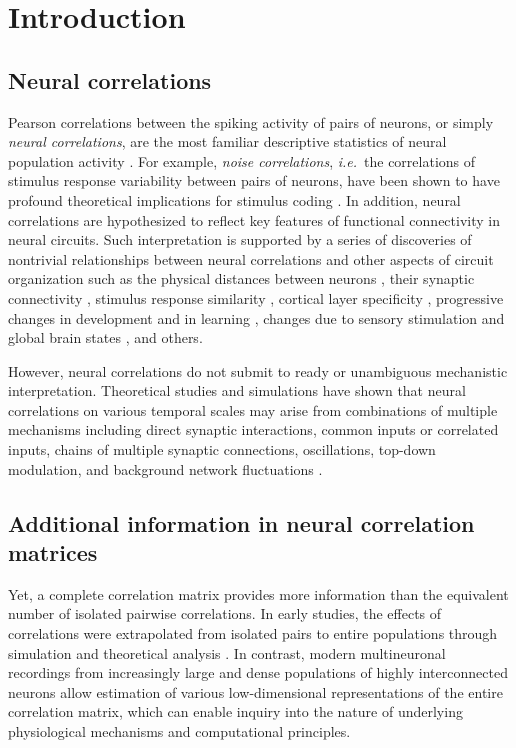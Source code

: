 \documentclass[10pt]{article}
\begin{document}
\section*{Introduction}
\subsection*{Neural correlations}
Pearson correlations between the spiking activity of pairs of neurons, or simply \emph{neural correlations}, are the most familiar descriptive statistics of neural population activity \cite{Averbeck:2006,Zohary:1994,Kohn:2005,Bair:2001,Ecker:2010}.  For example, \emph{noise correlations}, \emph{i.e.}~the correlations of stimulus response variability between pairs of neurons, have been shown to have profound theoretical implications for stimulus coding \cite{Zohary:1994,Abbott:1999,Sompolinsky:2001,Wilke:2002,Averbeck:2006,Josic:2009,Berens:2011,Ecker:2011}. In addition, neural correlations are hypothesized to reflect key features of functional connectivity in neural circuits.  Such interpretation is supported by a series of discoveries of nontrivial relationships between neural correlations and other aspects of circuit organization such as the physical distances between neurons \cite{Smith:2008,Denman:2013}, their synaptic connectivity \cite{Ko:2011},  stimulus response similarity \cite{Bair:2001,Kohn:2005,Cohen:2008,Cohen:2009,Ko:2011,Smith:2013b}, cortical layer specificity \cite{Hansen:2012,Smith:2013}, progressive changes in development and in learning \cite{Golshani:2009,Gu:2011}, changes due to sensory stimulation and global brain states \cite{Goard:2009,Kohn:2009,Ecker:2010,Renart:2010}, and others.

However, neural correlations do not submit to ready or unambiguous mechanistic interpretation.  Theoretical studies and simulations have shown that neural correlations on various temporal scales may arise from combinations of multiple mechanisms including  direct synaptic interactions, common inputs or correlated inputs, chains of multiple synaptic connections, oscillations, top-down modulation, and background network fluctuations \cite{Perkel:1967b,Moore:1970,Shadlen:1998,Salinas:2001,Ostojic:2009,Rosenbaum:2011}. 

\subsection*{Additional information in neural correlation matrices}
Yet, a complete correlation matrix provides more information than the equivalent number of isolated pairwise correlations. In early studies, the effects of correlations were extrapolated from isolated pairs to entire populations through simulation and theoretical analysis \cite{Shadlen:1998,Zohary:1994}. In contrast, modern multineuronal recordings from increasingly large and dense populations of highly interconnected neurons allow estimation of various low-dimensional representations of the entire correlation matrix, which can enable inquiry into the nature of underlying physiological mechanisms and computational principles.  
\end{document}
